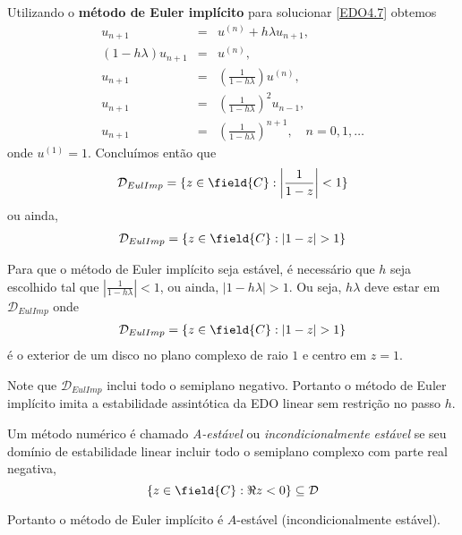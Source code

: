 \begin{ex}
Utilizando o \textbf{método de Euler implícito} para solucionar \eqref{EDO4.7} obtemos
\begin{eqnarray}
 u_{n+1}      &=& u^{(n)}+h\lambda u_{n+1}, \\
 (1-h\lambda )u_{n+1} & =& u^{(n)}, \\
       u_{n+1} & =& \left(\frac{1}{1- h\lambda }\right)u^{(n)}, \\
       u_{n+1} & =& \left(\frac{1}{1- h\lambda }\right)^2u_{n-1}, \\
       u_{n+1} & =& \left(\frac{1}{1- h\lambda }\right)^{n+1}, \quad  n=0,1,\ldots
\end{eqnarray}
onde $u^{(1)}=1$.
Concluímos então que
\begin{eqnarray}
 \mathcal D_{EulImp} = \{z \in  \field{C}:  \left|\frac{1}{1- z}\right|<1\}
\end{eqnarray}
ou ainda,
\begin{eqnarray}
 \mathcal D_{EulImp} = \{z \in  \field{C}:  |1- z|>1\}
\end{eqnarray}

Para que o método de Euler implícito seja estável, é necessário que $h$ seja escolhido tal que $\left|\frac{1}{1- h\lambda }\right|<1$, ou ainda, $|1-h\lambda |>1$. Ou seja, $h\lambda $ deve estar em $\mathcal D_{EulImp}$ onde
\begin{eqnarray}
 \mathcal D_{EulImp} = \{z \in  \field{C}: |1-z|>1\}
\end{eqnarray}
é o exterior de um disco no plano complexo de raio $1$ e centro em $z=1$.

Note que $\mathcal D_{EulImp}$ inclui todo o semiplano negativo. Portanto o método de Euler implícito imita a estabilidade assintótica da EDO linear sem restrição no passo $h$.

\end{ex}

\begin{defn}
Um método numérico é chamado \emph{A-estável} ou \emph{incondicionalmente estável} se seu domínio de estabilidade linear incluir todo o semiplano complexo com parte real negativa,
$$    \{z \in \field{C}: \Re{z}<0\} \subseteq \mathcal D$$
\end{defn}


Portanto o método de Euler implícito é $A$-estável (incondicionalmente estável).






